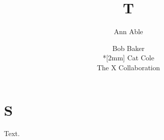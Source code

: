 \documentclass{webofc}
\begin{document}
\title{T}
\author{Ann Able \and Bob Baker\\*[2mm] Cat Cole\\ [1mm] The X Collaboration}
\maketitle
\section{S}
Text.
\end{document}
